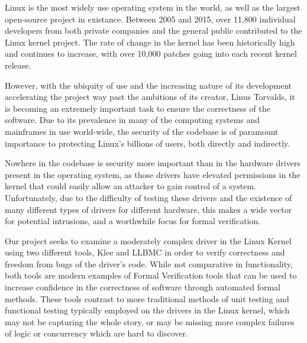 Linux is the most widely use operating system in the world, 
as well as the largest open-source project in existance.
Between 2005 and 2015, over 11,800 individual developers from both private companies
and the general public contributed to the Linux kernel project.
The rate of change in the kernel has been historically high and continues to increase,
with over 10,000 patches going into each recent kernel release. \cite{linux}
\par
However, with the ubiquity of use and the increasing nature of its development
accelerating the project way past the ambitions of its creator, Linus Torvalds,
it is becoming an extremely important task to ensure the correctness of the software.
Due to its prevalence in many of the computing systems and mainframes in use world-wide,
the security of the codebase is of paramount importance to protecting Linux's billions 
of users, both directly and indirectly.
\par
Nowhere in the codebase is security more important than in the hardware drivers present in
the operating system, as those drivers have elevated permissions in the kernel
that could easily allow an attacker to gain control of a system.
Unfortunately, due to the difficulty of testing these drivers and the existence of
many different types of drivers for different hardware, this makes a wide vector
for potential intrusions, and a worthwhile focus for formal verification.
\par
Our project seeks to examine a moderately complex driver in the Linux Kernel 
using two different tools, Klee \cite{klee} and LLBMC \cite{llbmc} in order to verify
correctness and freedom from bugs of the driver's code.
While not comparative in functionality, both tools are modern examples of Formal 
Verification tools that can be used to increase confidence in the correctness of software
through automated formal methods.
These tools contrast to more traditional methods of unit testing and functional testing
typically employed on the drivers in the Linux kernel, which may not be capturing the whole
story, or may be missing more complex failures of logic or concurrency which are hard to discover.
